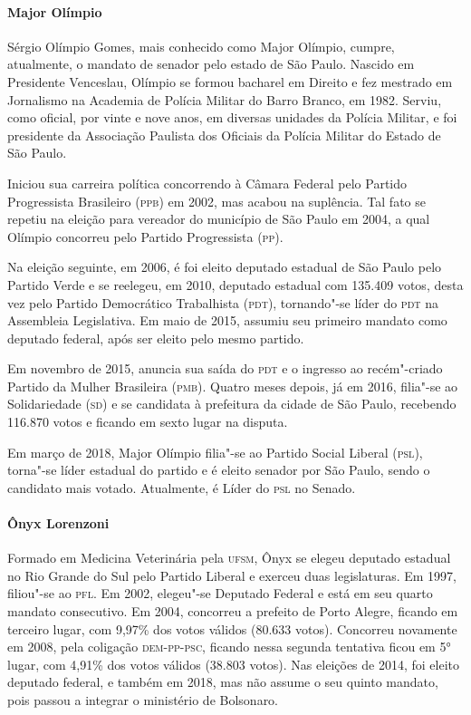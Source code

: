 \paragraph{Major Olímpio}

Sérgio Olímpio Gomes, mais conhecido como Major Olímpio, cumpre,
atualmente, o mandato de senador pelo estado de São Paulo. Nascido em
Presidente Venceslau, Olímpio se formou bacharel em Direito e fez
mestrado em Jornalismo na Academia de Polícia Militar do Barro Branco,
em 1982. Serviu, como oficial, por vinte e nove anos, em diversas
unidades da Polícia Militar, e foi presidente da Associação Paulista dos
Oficiais da Polícia Militar do Estado de São Paulo.

Iniciou sua carreira política concorrendo à Câmara Federal pelo Partido
Progressista Brasileiro (\textsc{ppb}) em 2002, mas acabou na suplência. Tal fato
se repetiu na eleição para vereador do município de São Paulo em 2004, a
qual Olímpio concorreu pelo Partido Progressista (\textsc{pp}).

Na eleição seguinte, em 2006, é foi eleito deputado estadual de São
Paulo pelo Partido Verde e se reelegeu, em 2010, deputado estadual com
135.409 votos, desta vez pelo Partido Democrático Trabalhista (\textsc{pdt}),
tornando"-se líder do \textsc{pdt} na Assembleia Legislativa. Em maio de 2015,
assumiu seu primeiro mandato como deputado federal, após ser eleito pelo
mesmo partido.

Em novembro de 2015, anuncia sua saída do \textsc{pdt} e o ingresso ao
recém"-criado Partido da Mulher Brasileira (\textsc{pmb}). Quatro meses depois, já
em 2016, filia"-se ao Solidariedade (\textsc{sd}) e se candidata à prefeitura da
cidade de São Paulo, recebendo 116.870 votos e ficando em sexto lugar na
disputa.

Em março de 2018, Major Olímpio filia"-se ao Partido Social Liberal
(\textsc{psl}), torna"-se líder estadual do partido e é eleito senador por São
Paulo, sendo o candidato mais votado. Atualmente, é Líder do \textsc{psl} no
Senado.

\paragraph{Ônyx Lorenzoni}

Formado em Medicina Veterinária pela \textsc{ufsm}, Ônyx se elegeu deputado
estadual no Rio Grande do Sul pelo Partido Liberal e exerceu duas
legislaturas. Em 1997, filiou"-se ao \textsc{pfl}. Em 2002, elegeu"-se Deputado
Federal e está em seu quarto mandato consecutivo. Em 2004, concorreu a
prefeito de Porto Alegre, ficando em terceiro lugar, com 9,97\% dos
votos válidos (80.633 votos). Concorreu novamente em 2008, pela
coligação \textsc{dem}-\textsc{pp}-\textsc{psc}, ficando nessa segunda tentativa ficou em 5° lugar,
com 4,91\% dos votos válidos (38.803 votos). Nas eleições de 2014, foi
eleito deputado federal, e também em 2018, mas não assume o seu quinto
mandato, pois passou a integrar o ministério de Bolsonaro.

